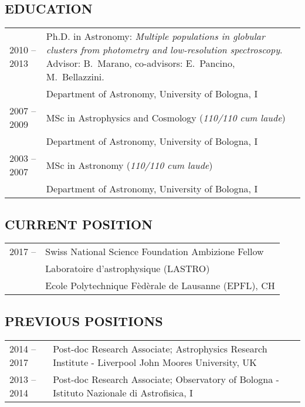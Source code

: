 \documentclass[ 11pt]{article}
\begin{document}
\subsection*{EDUCATION}
\begin{tabular}{p{2cm}p{14cm}}

  2010 -- 2013 & Ph.D. in Astronomy: {\em Multiple populations in globular clusters from photometry and low-resolution spectroscopy}. Advisor: B.~Marano, co-advisors: E.~Pancino, M.~Bellazzini.\\
                     &Department of Astronomy, University of Bologna, I\\
  2007 -- 2009  & MSc in Astrophysics and Cosmology ({\em 110/110 cum laude})\\
                      &  Department of Astronomy, University of Bologna, I\\
2003 -- 2007  & MSc  in Astronomy  ({\em 110/110 cum laude}) \\
		    & Department of Astronomy, University of Bologna, I\\

\end{tabular}

\subsection*{CURRENT POSITION}

\begin{tabular}{p{2cm}p{14cm}}
  2017 -- &Swiss National Science Foundation Ambizione Fellow\\
             &  Laboratoire d'astrophysique (LASTRO)\\
	    & Ecole Polytechnique F\`ed\`erale de Lausanne (EPFL), CH\\
\end{tabular}


  
\subsection*{PREVIOUS POSITIONS}
\begin{tabular}{p{2cm}p{14cm}}
  2014 -- 2017 & Post-doc Research Associate; Astrophysics Research Institute - Liverpool John Moores University, UK\\
 2013 -- 2014 & Post-doc Research Associate;  Observatory of Bologna - Istituto Nazionale di Astrofisica, I\\
\end{tabular}
\end{document}
